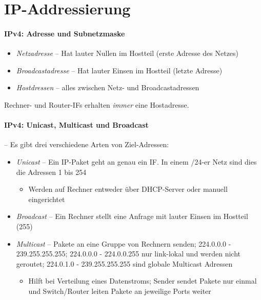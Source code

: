 \documentclass[a4paper,12pt]{article}
\begin{document}
\newpage
\section{IP-Addressierung}

\paragraph{IPv4: Adresse und Subnetzmaske}

\begin{itemize}
\item \emph{Netzadresse} -- Hat lauter Nullen im Hostteil (erste Adresse des Netzes)
\item \emph{Broadcastadresse} -- Hat lauter Einsen im Hostteil (letzte Adresse)
\item \emph{Hostdressen} -- alles zwischen Netz- und Broadcastadressen
\end{itemize}

Rechner- und Router-IFs erhalten \emph{immer} eine Hostadresse.

 

\paragraph{IPv4: Unicast, Multicast und Broadcast} -- Es gibt drei verschiedene Arten von Ziel-Adressen:
\begin{itemize}
\item \emph{Unicast} -- Ein IP-Paket geht an genau ein IF. In einem /24-er Netz sind dies die Adressen 1 bis 254
	\begin{itemize}
	\item Werden auf Rechner entweder über DHCP-Server oder manuell eingerichtet
	\end{itemize}
\item \emph{Broadcast} -- Ein Rechner stellt eine Anfrage mit lauter Einsen im Hostteil (255)
\item \emph{Multicast} -- Pakete an eine Gruppe von Rechnern senden; 224.0.0.0 - 239.255.255.255; 224.0.0.0 - 224.0.0.255 nur link-lokal und werden nicht geroutet; 224.0.1.0 - 239.255.255.255 sind globale Multicast Adressen
	\begin{itemize}
	\item Hilft bei Verteilung eines Datenstroms; Sender sendet Pakete nur einmal und Switch/Router leiten Pakete an jeweilige Ports weiter
	\end{itemize}
\end{itemize}
\end{document}
